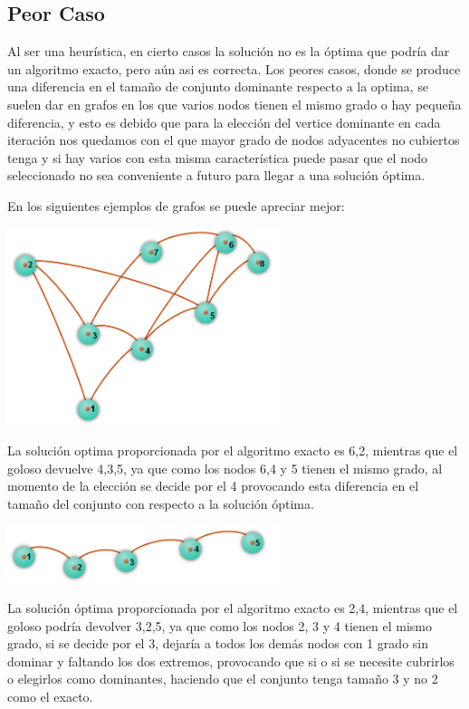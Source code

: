 \subsection{Peor Caso}

Al ser una heurística, en cierto casos la solución no es la óptima que podría dar un algoritmo exacto, pero aún asi es correcta.
Los peores casos, donde se produce una diferencia en el tamaño de conjunto dominante respecto a la optima, se suelen dar en grafos en los que varios nodos tienen el mismo grado o hay pequeña diferencia, y esto es debido que para la elección del vertice dominante en cada iteración nos quedamos con el que mayor grado de nodos adyacentes no cubiertos tenga y si hay varios con esta misma característica puede pasar que el nodo seleccionado no sea conveniente a futuro para llegar a una solución óptima.

En los siguientes ejemplos de grafos se puede apreciar mejor:

\begin {center}
\includegraphics[width=8cm]{./graficos/grafo.png}
\end {center} 
La solución optima proporcionada por el algoritmo exacto es {6,2}, mientras que el goloso devuelve {4,3,5}, ya que como los nodos 6,4 y 5 tienen el mismo grado, al momento de la elección se decide por el 4 provocando esta diferencia en el tamaño del conjunto con respecto a la solución óptima.

\begin {center}
\includegraphics[width=8cm]{./graficos/grafo_camino.png}
\end {center} 
La solución óptima proporcionada por el algoritmo exacto es {2,4}, mientras que el goloso podría devolver {3,2,5}, ya que como los nodos 2, 3 y 4 tienen el mismo grado, si se decide por el 3, dejaría a todos los demás nodos con 1 grado sin dominar y faltando los dos extremos, provocando que si o si se necesite cubrirlos o elegirlos como dominantes, haciendo que el conjunto tenga tamaño 3 y no 2 como el exacto.

